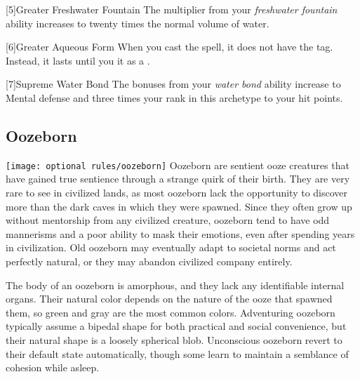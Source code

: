             [5]{Greater Freshwater Fountain} The multiplier from your \textit{freshwater fountain} ability increases to twenty times the normal volume of water.

            [6]{Greater Aqueous Form} When you cast the  spell, it does not have the  tag.
            Instead, it lasts until you  it as a .

            [7]{Supreme Water Bond} The bonuses from your \textit{water bond} ability increase to  Mental defense and three times your rank in this archetype to your hit points.

    \subsection{Oozeborn}
        \texttt{[image: optional rules/oozeborn]}
        Oozeborn are sentient ooze creatures that have gained true sentience through a strange quirk of their birth.
        They are very rare to see in civilized lands, as most oozeborn lack the opportunity to discover more than the dark caves in which they were spawned.
        Since they often grow up without mentorship from any civilized creature, oozeborn tend to have odd mannerisms and a poor ability to mask their emotions, even after spending years in civilization.
        Old oozeborn may eventually adapt to societal norms and act perfectly natural, or they may abandon civilized company entirely.

        The body of an oozeborn is amorphous, and they lack any identifiable internal organs.
        Their natural color depends on the nature of the ooze that spawned them, so green and gray are the most common colors.
        Adventuring oozeborn typically assume a bipedal shape for both practical and social convenience, but their natural shape is a loosely spherical blob.
        Unconscious oozeborn revert to their default state automatically, though some learn to maintain a semblance of cohesion while asleep.

